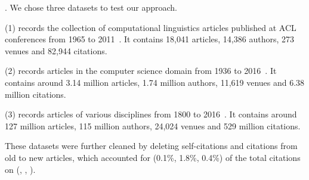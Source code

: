 . We chose three datasets to test our approach.

\noindent
(1) \aan records the collection of computational linguistics articles published at ACL conferences from 1965 to 2011~\cite{Liang16AAAI}.
It contains 18,041 articles, 14,386 authors, 273 venues and 82,944 citations.

\noindent
(2) \aminer records articles in the computer science domain from 1936 to 2016~\cite{Tang:08KDD}.
It contains around 3.14 million articles, 1.74 million authors, 11,619 venues and 6.38 million citations.

\noindent
(3) \magdata records articles of various disciplines from 1800 to 2016~\cite{Sinha15:MAG}.
It contains around 127 million articles, 115 million authors, 24,024 venues and 529 million citations.

These datasets were further cleaned by deleting self-citations and citations from old  to new articles, which accounted for (0.1\%, 1.8\%, 0.4\%) of the total citations on (\aan, \aminer, \magdata).








